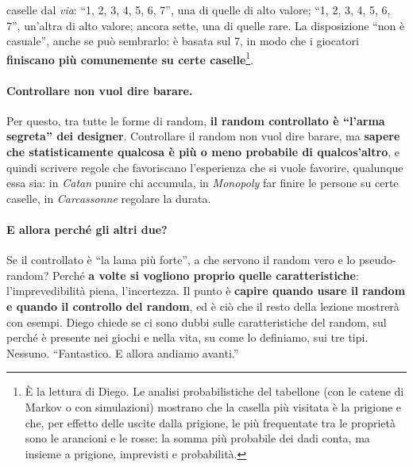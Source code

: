 \begin{itemize}
        caselle dal \emph{via}: ``1, 2, 3, 4, 5, 6, 7'', una di quelle di alto valore; ``1,
        2, 3, 4, 5, 6, 7'', un'altra di alto valore; ancora sette, una di quelle rare. La
        disposizione ``non è casuale'', anche se può sembrarlo: è basata sul 7, in modo che i
        giocatori \textbf{finiscano più comunemente su certe caselle}\footnote{È la lettura di
        Diego. Le analisi probabilistiche del tabellone (con le catene di Markov o con
        simulazioni) mostrano che la casella più visitata è la prigione e che, per effetto
        delle uscite dalla prigione, le più frequentate tra le proprietà sono le arancioni e
        le rosse: la somma più probabile dei dadi conta, ma insieme a prigione, imprevisti e
        probabilità.}.
\end{itemize}

\paragraph{Controllare non vuol dire barare.} Per questo, tra tutte le forme di random,
\textbf{il random controllato è ``l'arma segreta'' dei designer}. Controllare il random non
vuol dire barare, ma \textbf{sapere che statisticamente qualcosa è più o meno probabile di
qualcos'altro}, e quindi scrivere regole che favoriscano l'esperienza che si vuole favorire,
qualunque essa sia: in \emph{Catan} punire chi accumula, in \emph{Monopoly} far finire le
persone su certe caselle, in \emph{Carcassonne} regolare la durata.

\paragraph{E allora perché gli altri due?} Se il controllato è ``la lama più forte'', a che
servono il random vero e lo pseudo-random? Perché \textbf{a volte si vogliono proprio quelle
caratteristiche}: l'imprevedibilità piena, l'incertezza. Il punto è \textbf{capire quando
usare il random e quando il controllo del random}, ed è ciò che il resto della lezione
mostrerà con esempi. Diego chiede se ci sono dubbi sulle caratteristiche del random, sul
perché è presente nei giochi e nella vita, su come lo definiamo, sui tre tipi. Nessuno.
``Fantastico. E allora andiamo avanti.''

